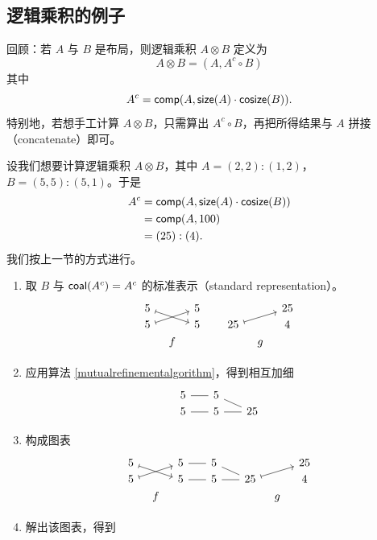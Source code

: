 \subsection{逻辑乘积的例子}

回顾：若 $A$ 与 $B$ 是布局，则逻辑乘积 $A \otimes B$ 定义为
\[
A \otimes B = (A, A^c \circ B)
\]
其中
\[
A^c= \mathsf{comp}(A, \mathsf{size}(A)\cdot \mathsf{cosize}(B)).
\]
特别地，若想手工计算 $A \otimes B$，只需算出 $A^c \circ B$，再把所得结果与 $A$ 拼接（concatenate）即可。

\begin{example}
    设我们想要计算逻辑乘积 $A \otimes B$，其中 $A = (2,2):(1,2)$，$B = (5,5):(5,1)$。于是
    \begin{align*}
    A^c & = \mathsf{comp}(A,\mathsf{size}(A)\cdot \mathsf{cosize}(B))\\
     & = \mathsf{comp}(A, 100)\\
     & = (25):(4).
    \end{align*}
    我们按上一节的方式进行。
    \begin{enumerate}
        \item 取 $B$ 与 $\mathsf{coal}(A^c) = A^c$ 的标准表示（standard representation）。
        \[ \begin{tikzcd} [row sep = 1, column sep = 8]
        5 \ar[drr,mapsto] & & 5 & & & & 25\\
        5 \ar[urr,mapsto] & & 5 & & 25 \ar[urr,mapsto] & & 4\\
        & f & & & & g & \\
        \end{tikzcd} \]
        \item 应用算法 \ref{mutualrefinementalgorithm}，得到相互加细
        \[ \begin{tikzcd} [row sep = 1, column sep = 8]
        5 \ar[rr,-] & & 5 & & \\
        5 \ar[rr,-] & & 5 & & \ar[ll,-] \ar[ull,-] 25 \\
        \end{tikzcd} \]
        \item 构成图表
        \[ \begin{tikzcd} [row sep = 1, column sep = 8]
        5 \ar[drr,mapsto] & & 5 \ar[rr,-] & & 5 & & & & 25 \\
        5 \ar[urr,mapsto] & & 5 \ar[rr,-] & & 5 & & \ar[ll,-] \ar[ull,-] 25 \ar[urr,mapsto] & & 4\\
         & f & & & & & & g & \\
        \end{tikzcd} \]
        \item 解出该图表，得到

\end{enumerate}
\end{example}
